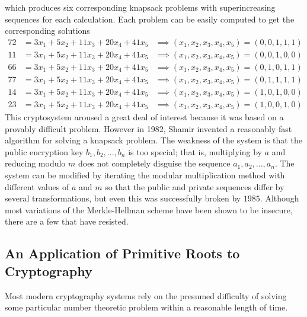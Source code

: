 \documentclass{article}
\theoremstyle{remark}
\theoremstyle{definition}
\begin{document}
which produces six corresponding knapsack problems with superincreasing sequences for each calculation. Each problem can be easily computed to get the corresponding solutions
\begin{align*}
    72 & = 3x_1 + 5x_2 + 11x_3 + 20x_4 + 41x_5 & \implies (x_1, x_2, x_3, x_4, x_5) = (0,0,1,1,1) \\
    11 & = 3x_1 + 5x_2 + 11x_3 + 20x_4 + 41x_5 & \implies (x_1, x_2, x_3, x_4, x_5) = (0,0,1,0,0) \\
    66 & = 3x_1 + 5x_2 + 11x_3 + 20x_4 + 41x_5 & \implies (x_1, x_2, x_3, x_4, x_5) = (0,1,0,1,1) \\
    77 & = 3x_1 + 5x_2 + 11x_3 + 20x_4 + 41x_5 & \implies (x_1, x_2, x_3, x_4, x_5) = (0,1,1,1,1) \\
    14 & = 3x_1 + 5x_2 + 11x_3 + 20x_4 + 41x_5 & \implies (x_1, x_2, x_3, x_4, x_5) = (1,0,1,0,0) \\
    23 & = 3x_1 + 5x_2 + 11x_3 + 20x_4 + 41x_5& \implies (x_1, x_2, x_3, x_4, x_5) = (1,0,0,1,0) 
\end{align*}
This cryptosystem aroused a great deal of interest because it was based on a provably difficult problem. However in 1982, Shamir invented a reasonably fast algorithm for solving a knapsack problem. The weakness of the system is that the public encryption key $b_1, b_2, ..., b_n$ is too special; that is, multiplying by $a$ and reducing modulo $m$ does not completely disguise the sequence $a_1, a_2, ..., a_n$. The system can be modified by iterating the modular multiplication method with different values of $a$ and $m$ so that the public and private sequences differ by several transformations, but even this was successfully broken by $1985$. Although most variations of the Merkle-Hellman scheme have been shown to be insecure, there are a few that have resisted. 

\subsection{An Application of Primitive Roots to Cryptography}
Most modern cryptography systems rely on the presumed difficulty of solving some particular number theoretic problem within a reasonable length of time. 
\end{document}

